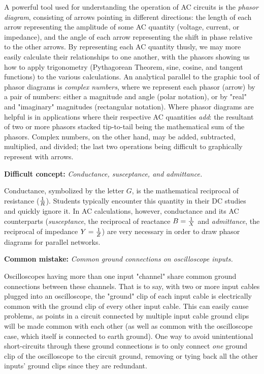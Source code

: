 A powerful tool used for understanding the operation of AC circuits is the {\it phasor diagram}, consisting of arrows pointing in different directions: the length of each arrow representing the amplitude of some AC quantity (voltage, current, or impedance), and the angle of each arrow representing the shift in phase relative to the other arrows.  By representing each AC quantity thusly, we may more easily calculate their relationships to one another, with the phasors showing us how to apply trigonometry (Pythagorean Theorem, sine, cosine, and tangent functions) to the various calculations.  An analytical parallel to the graphic tool of phasor diagrams is {\it complex numbers}, where we represent each phasor (arrow) by a pair of numbers: either a magnitude and angle (polar notation), or by "real" and "imaginary" magnitudes (rectangular notation).  Where phasor diagrams are helpful is in applications where their respective AC quantities {\it add}: the resultant of two or more phasors stacked tip-to-tail being the mathematical sum of the phasors.  Complex numbers, on the other hand, may be added, subtracted, multiplied, and divided; the last two operations being difficult to graphically represent with arrows.

\vskip 10pt

\noindent
{\bf Difficult concept: } {\it Conductance, susceptance, and admittance.}

Conductance, symbolized by the letter $G$, is the mathematical reciprocal of resistance ($1 \over R$).  Students typically encounter this quantity in their DC studies and quickly ignore it.  In AC calculations, however, conductance and its AC counterparts ({\it susceptance}, the reciprocal of reactance $B = {1 \over X}$ and {\it admittance}, the reciprocal of impedance $Y = {1 \over Z}$) are very necessary in order to draw phasor diagrams for parallel networks.

\vskip 10pt

\noindent
{\bf Common mistake: } {\it Common ground connections on oscilloscope inputs.}

Oscilloscopes having more than one input "channel" share common ground connections between these channels.  That is to say, with two or more input cables plugged into an oscilloscope, the "ground" clip of each input cable is electrically common with the ground clip of every other input cable.  This can easily cause problems, as points in a circuit connected by multiple input cable ground clips will be made common with each other (as well as common with the oscilloscope case, which itself is connected to earth ground).  One way to avoid unintentional short-circuits through these ground connections is to only connect {\it one} ground clip of the oscilloscope to the circuit ground, removing or tying back all the other inputs' ground clips since they are redundant.


